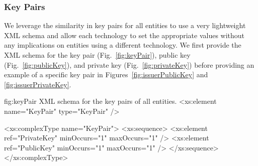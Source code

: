 % 
% 
% 
% 



\subsubsection{Key Pairs}
\label{sec:keypair}

We leverage the similarity in key pairs for all entities to use a very lightweight XML schema and allow each technology 
to set the appropriate 
values without any implications on entities using a different technology. 
%
We first provide the XML schema for the key pair (Fig.~\ref{fig:keyPair}), public key (Fig.~\ref{fig:publicKey}), and
private key (Fig.~\ref{fig:privateKey}) before providing an example of a specific key pair in 
Figures~\ref{fig:issuerPublicKey} and \ref{fig:issuerPrivateKey}.


\begin{xml}
{fig:keyPair}
{XML schema for the key pairs of all entities.}
<xs:element name="KeyPair" type="KeyPair" />

<xs:complexType name="KeyPair">
  <xs:sequence>
    <xs:element ref="PrivateKey" minOccurs="1" maxOccurs="1" />
    <xs:element ref="PublicKey" minOccurs="1" maxOccurs="1" />
  </xs:sequence>
</xs:complexType>
\end{xml}


